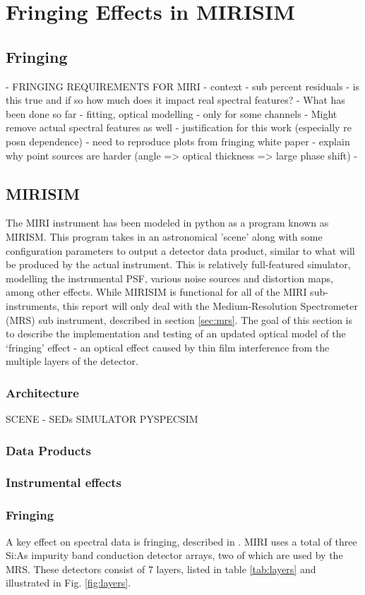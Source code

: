 \chapter{Fringing Effects in MIRISIM}
\section{Fringing}
 - FRINGING REQUIREMENTS FOR MIRI - context
 - sub percent residuals - is this true and if so how much does it impact real spectral features?
 - What has been done so far - fitting, optical modelling
 - only for some channels
 - Might remove actual spectral features as well - justification for this work (especially re posn dependence)
 - need to reproduce plots from fringing white paper
 - explain why point sources are harder (angle => optical thickness => large phase shift)
 - 
 \cite{Lahuis2018} %
\section{MIRISIM}
\cite{Consortium2018} %
\cite{Cossou2019} %
The MIRI instrument has been modeled in python as a program known as MIRISM. 
This program takes in an astronomical 'scene' along with some configuration parameters to output a detector data product, similar to what will be produced by the actual instrument.
This is relatively full-featured simulator, modelling the instrumental PSF, various noise sources and distortion maps, among other effects.
While MIRISIM is functional for all of the MIRI sub-instruments, this report will only deal with the Medium-Resolution Spectrometer (MRS) sub instrument, described in section \ref{sec:mrs}.
The goal of this section is to describe the implementation and testing of an updated optical model of the `fringing' effect - an optical effect caused by thin film interference from the multiple layers of the detector.
\subsection{Architecture}
SCENE - SEDs
SIMULATOR
PYSPECSIM
\subsection{Data Products}
\subsection{Instrumental effects}
\subsection{Fringing}
\cite{Lahuis2003} %
\cite{VanderPlas2018} %
A key effect on spectral data is fringing, described in \cite{ref:Argyriou2018}. 
MIRI uses a total of three Si:As impurity band conduction detector arrays, two of which are used by the MRS. 
These detectors consist of 7 layers, listed in table \ref{tab:layers} and illustrated in Fig. \ref{fig:layers}.

